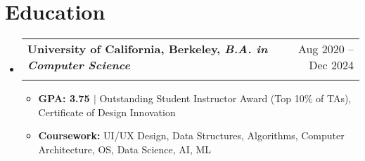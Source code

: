 \documentclass[letterpaper,11pt]{article}
\makeatletter
\newcommand{\resumeItem}[1]{
  \item\small{
    {#1 \vspace{2pt}}
  }
}
\newcommand{\resumeSubheading}[4]{
  \vspace{-1pt}\item
    \begin{tabular*}{0.97\textwidth}[t]{l@{\extracolsep{\fill}}r}
      \textbf{#1} & #2 \\
      \textit{\small#3} & \textit{\small #4} \\
    \end{tabular*}\vspace{-5pt}
}
\newcommand{\resumeSubHeadingListStart}{\begin{itemize}[leftmargin=0.15in, label={}]}
\newcommand{\resumeSubHeadingListEnd}{\end{itemize}}
\newcommand{\resumeItemListStart}{\begin{itemize}}
\newcommand{\resumeItemListEnd}{\end{itemize}\vspace{-5pt}}
\makeatother
\begin{document}
\section{Education}
  \resumeSubHeadingListStart
    \resumeSubheading
      {University of California, Berkeley, \textnormal{\textit{B.A. in Computer Science}}}{Aug 2020 -- Dec 2024}
      {}{}
      \vspace{-15pt}
      \resumeItemListStart
      \resumeItem{\textbf{GPA: 3.75 $|$}{ Outstanding Student Instructor Award (Top 10\% of TAs)}, Certificate of Design Innovation}
      \resumeItem{\textbf{Coursework:} UI/UX Design, Data Structures, Algorithms, Computer Architecture, OS, Data Science, AI, ML}
      \resumeItemListEnd
  \resumeSubHeadingListEnd


\end{document}

